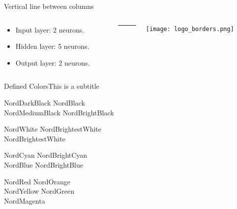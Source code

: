 \documentclass{beamer}
\begin{document}
\begin{frame}{Vertical line between columns}

	\begin{columns}[T]%
		\begin{column}{0.49\textwidth}

			\begin{itemize}
				\item Input layer: 2 neurons.
				\item Hidden layer: 5 neurons.
				\item Output layer: 2 neurons.
			\end{itemize}

		\end{column}
		\begin{column}{.02\textwidth}
			\rule{.1mm}{0.7\textheight}
		\end{column}
		\begin{column}{0.49\textwidth}
			\texttt{[image: logo\_borders.png]}
		\end{column}

	\end{columns}
\end{frame}

\begin{frame}{Defined Colors}{This is a subtitle}
	\begin{description}
		\item[Polar Night]
			\textcolor{NordDarkBlack}{NordDarkBlack} \quad \textcolor{NordBlack}{NordBlack}\\
			\textcolor{NordMediumBlack}{NordMediumBlack} \quad \textcolor{NordBrightBlack}{NordBrightBlack}
		\item[Snow Storm]
			\textcolor{NordWhite}{NordWhite} \quad \textcolor{NordBrighterWhite}{NordBrightestWhite}\\
			\textcolor{NordBrightestWhite}{NordBrightestWhite}
		\item[Frost]
			\textcolor{NordCyan}{NordCyan} \quad \textcolor{NordBrightCyan}{NordBrightCyan}\\
			\textcolor{NordBlue}{NordBlue} \quad \textcolor{NordBrightBlue}{NordBrightBlue}
		\item[Aurora]
			\textcolor{NordRed}{NordRed} \quad \textcolor{NordOrange}{NordOrange} \\
			\textcolor{NordYellow}{NordYellow} \quad \textcolor{NordGreen}{NordGreen} \\
			\textcolor{NordMagenta}{NordMagenta}
	\end{description}
\end{frame}
\end{document}
